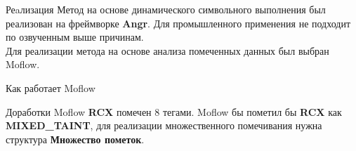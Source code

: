 \documentclass[10pt]{beamer}
\begin{document}
\begin{frame}{Реaлизация}
Метод на основе динамического символьного выполнения был реализован на фреймворке \textbf{Angr}. Для промышленного применения не подходит по озвученным выше причинам.
\\
\pause
Для реализации метода на основе анализа помеченных данных был выбран Moflow.

\end{frame}


\begin{frame}[fragile]{Как работает Moflow}


\end{frame}


\begin{frame}[fragile]{Доработки Moflow}
    \textbf{RCX} помечен $8$ тегами. Moflow бы пометил бы
    \textbf{RCX} как \textbf{MIXED\_TAINT}, для реализации множественного помечивания нужна  структура \textbf{Множество пометок}.


\end{frame}
\end{document}
